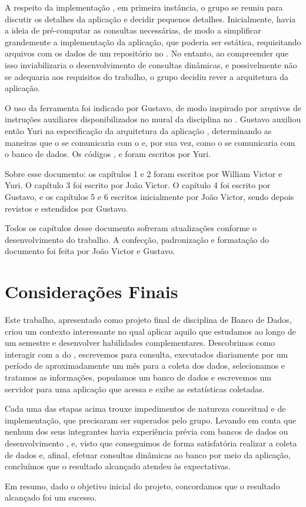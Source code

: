    A respeito da implementação , em primeira instância, o grupo se reuniu para discutir os detalhes da aplicação 
   e decidir pequenos detalhes. Inicialmente, havia a ideia de pré-computar as consultas necessárias, de modo a simplificar
   grandemente a implementação da aplicação, que poderia ser estática, requisitando arquivos  com os dados de um
   repositório no . No entanto, ao compreender que isso inviabilizaria o desenvolvimento de consultas dinâmicas,
   e possivelmente não se adequaria aos requisitos do trabalho, o grupo decidiu rever a arquitetura da aplicação.

   O uso da ferramenta  foi indicado por Gustavo, de modo inspirado por arquivos de instruções auxiliares
   disponibilizados no mural da disciplina no . Gustavo auxiliou então Yuri na especificação da
   arquitetura da aplicação , determinando as maneiras que o  se comunicaria com o
    e, por sua vez, como o  se comunicaria com o banco de dados.
   Os códigos ,  e  foram escritos por Yuri.

    Sobre esse documento: os capítulos 1 e 2 foram escritos por William Victor e Yuri.
    O capítulo 3 foi escrito por João Victor.
    O capítulo 4 foi escrito por Gustavo, e os capítulos 5 e 6 escritos inicialmente por João Victor,
    sendo depois revistos e estendidos por Gustavo.

    Todos os capítulos desse documento sofreram atualizações conforme o desenvolvimento do trabalho. A confecção, padronização
    e formatação do documento foi feita por João Victor e Gustavo.

\chapter{Considerações Finais}

   Este trabalho, apresentado como projeto final de disciplina de Banco de Dados, criou um contexto interessante no qual
   aplicar aquilo que estudamos ao longo de um semestre e desenvolver habilidades complementares.
   Descobrimos como interagir com a  do , escrevemos  para consulta, executados diariamente
   por um período de aproximadamente um mês para a coleta dos dados, selecionamos e tratamos as informações,
   populamos um banco de dados  e escrevemos um servidor para uma aplicação  que acessa e exibe
   as estatísticas coletadas.

   Cada uma das etapas acima trouxe impedimentos de natureza conceitual e de implementação, que precisaram ser superados pelo
   grupo. Levando em conta que nenhum dos seus
   integrantes havia experiência prévia com bancos de dados ou desenvolvimento , e, visto que conseguimos
   de forma satisfatória realizar a coleta de dados e, afinal, efetuar consultas dinâmicas ao banco por meio da aplicação,
   concluímos que o resultado alcançado atendeu às expectativas.

   Em resumo, dado o objetivo inicial do projeto, concordamos que o resultado alcançado foi um sucesso.
   
